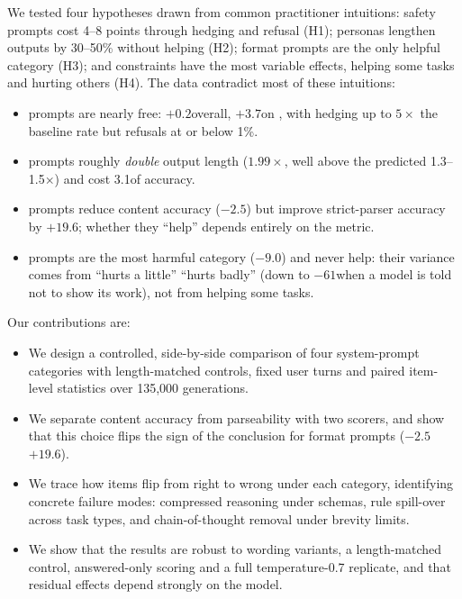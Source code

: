 We tested four hypotheses drawn from common practitioner intuitions: safety prompts cost 4--8 points through hedging and refusal (H1); personas lengthen outputs by 30--50\% without helping (H2); format prompts are the only helpful category (H3); and constraints have the most variable effects, helping some tasks and hurting others (H4). The data contradict most of these intuitions:
\begin{itemize}[leftmargin=*,itemsep=0pt,topsep=0pt]
    \item \safety prompts are nearly free: $+0.2$\pp overall, $+3.7$\pp on \tqa, with hedging up to $5\times$ the baseline rate but refusals at or below 1\%.
    \item \persona prompts roughly {\em double} output length ($1.99\times$, well above the predicted 1.3--1.5$\times$) and cost 3.1\pp of accuracy.
    \item \format prompts reduce content accuracy ($-2.5$\pp) but improve strict-parser accuracy by $+19.6$\pp; whether they ``help'' depends entirely on the metric.
    \item \constraint prompts are the most harmful category ($-9.0$\pp) and never help: their variance comes from ``hurts a little'' \versus ``hurts badly'' (down to $-61$\pp when a model is told not to show its work), not from helping some tasks.
\end{itemize}

\noindent Our contributions are:
\begin{itemize}[leftmargin=*,itemsep=0pt,topsep=0pt]
    \item We design a controlled, side-by-side comparison of four system-prompt categories with length-matched controls, fixed user turns and paired item-level statistics over 135,000 generations.
    \item We separate content accuracy from parseability with two scorers, and show that this choice flips the sign of the conclusion for format prompts ($-2.5$\pp \versus $+19.6$\pp).
    \item We trace how items flip from right to wrong under each category, identifying concrete failure modes: compressed reasoning under schemas, rule spill-over across task types, and chain-of-thought removal under brevity limits.
    \item We show that the results are robust to wording variants, a length-matched control, answered-only scoring and a full temperature-0.7 replicate, and that residual effects depend strongly on the model.
\end{itemize}

